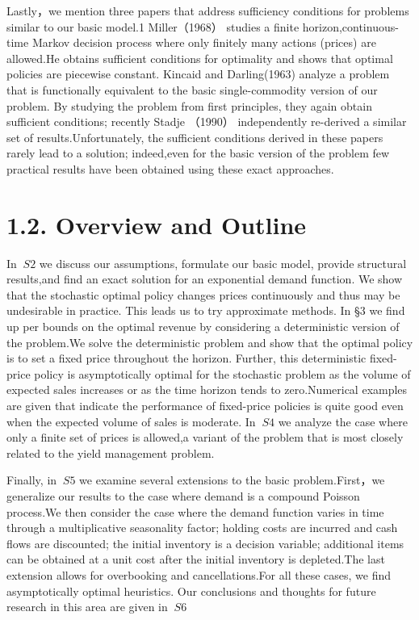 Lastly，we mention three papers that address sufficiency conditions for
problems similar to our basic model.1 Miller（1968） studies a finite
horizon,continuous-time Markov decision process where only finitely many
actions (prices) are allowed.He obtains sufficient conditions for
optimality and shows that optimal policies are piecewise constant.
Kincaid and Darling(1963) analyze a problem that is functionally
equivalent to the basic single-commodity version of our problem. By
studying the problem from first principles, they again obtain sufficient
conditions; recently Stadje （1990） independently re-derived a similar
set of results.Unfortunately, the sufficient conditions derived in these
papers rarely lead to a solution; indeed,even for the basic version of
the problem few practical results have been obtained using these exact
approaches.

\section{1.2. Overview and Outline}\label{overview-and-outline}

In \(\ S 2\) we discuss our assumptions, formulate our basic model,
provide structural results,and find an exact solution for an exponential
demand function. We show that the stochastic optimal policy changes
prices continuously and thus may be undesirable in practice. This leads
us to try approximate methods. In §3 we find up per bounds on the
optimal revenue by considering a deterministic version of the problem.We
solve the deterministic problem and show that the optimal policy is to
set a fixed price throughout the horizon. Further, this deterministic
fixed-price policy is asymptotically optimal for the stochastic problem
as the volume of expected sales increases or as the time horizon tends
to zero.Numerical examples are given that indicate the performance of
fixed-price policies is quite good even when the expected volume of
sales is moderate. In \(\ S 4\) we analyze the case where only a finite
set of prices is allowed,a variant of the problem that is most closely
related to the yield management problem.

Finally, in \(\ S 5\) we examine several extensions to the basic
problem.First，we generalize our results to the case where demand is a
compound Poisson process.We then consider the case where the demand
function varies in time through a multiplicative seasonality factor;
holding costs are incurred and cash flows are discounted; the initial
inventory is a decision variable; additional items can be obtained at a
unit cost after the initial inventory is depleted.The last extension
allows for overbooking and cancellations.For all these cases, we find
asymptotically optimal heuristics. Our conclusions and thoughts for
future research in this area are given in \(\ S 6\)

